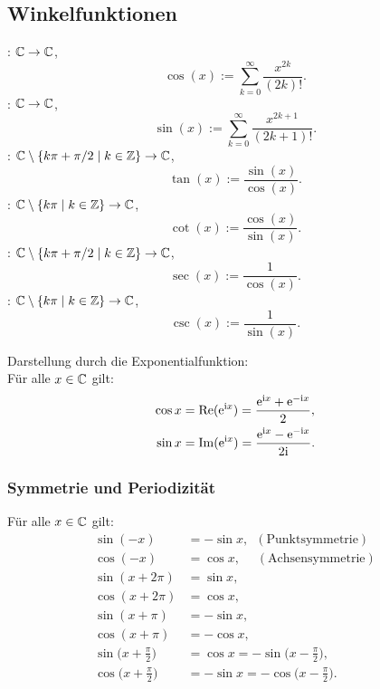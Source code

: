 \subsection{Winkelfunktionen}
\begin{Definition}
: $\mathbb C\to\mathbb C$,
\begin{equation}
\cos(x) := \sum_{k=0}^\infty \frac{x^{2k}}{(2k)!}.
\end{equation}
: $\mathbb C\to\mathbb C$,
\begin{equation}
\sin(x) := \sum_{k=0}^\infty \frac{x^{2k+1}}{(2k+1)!}.
\end{equation}
: $\mathbb C\setminus\{k\pi+\pi/2\mid k\in\mathbb Z\}\to\mathbb C$,
\begin{equation}
\tan(x) := \frac{\sin(x)}{\cos(x)}.
\end{equation}
: $\mathbb C\setminus\{k\pi\mid k\in\mathbb Z\}\to\mathbb C$,
\begin{equation}
\cot(x) := \frac{\cos(x)}{\sin(x)}.
\end{equation}
: $\mathbb C\setminus\{k\pi+\pi/2\mid k\in\mathbb Z\}\to\mathbb C$,
\begin{equation}
\sec(x) := \frac{1}{\cos(x)}.
\end{equation}
: $\mathbb C\setminus\{k\pi\mid k\in\mathbb Z\}\to\mathbb C$,
\begin{equation}
\csc(x) := \frac{1}{\sin(x)}.
\end{equation}
\end{Definition}
\noindent
Darstellung durch die Exponentialfunktion:\\
Für alle $x\in\mathbb C$ gilt:
\begin{align}
\cos x &= \operatorname*{Re}(\mathrm e^{\mathrm i x}) = \frac{\mathrm e^{\mathrm i x}+\mathrm e^{-\mathrm i x}}{2},\\
\sin x &= \operatorname*{Im}(\mathrm e^{\mathrm i x}) = \frac{\mathrm e^{\mathrm i x}-\mathrm e^{-\mathrm i x}}{2\mathrm i}.
\end{align}

\subsubsection{Symmetrie und Periodizität}
Für alle $x\in\mathbb C$ gilt:
\begin{align}
\sin(-x) &= -\sin x,\enspace(\text{Punktsymmetrie})\\
\cos(-x) &= \cos x,\quad\;(\text{Achsensymmetrie})\\
\sin(x+2\pi) &= \sin x,\\
\cos(x+2\pi) &= \cos x,\\
\sin(x+\pi)  &=-\sin x,\\
\cos(x+\pi)  &=-\cos x,\\
\sin\Big(x+\frac{\pi}{2}\Big) &= \cos x = -\sin\Big(x-\frac{\pi}{2}\Big),\\
\cos\Big(x+\frac{\pi}{2}\Big) &= -\sin x = -\cos\Big(x-\frac{\pi}{2}\Big).
\end{align}

